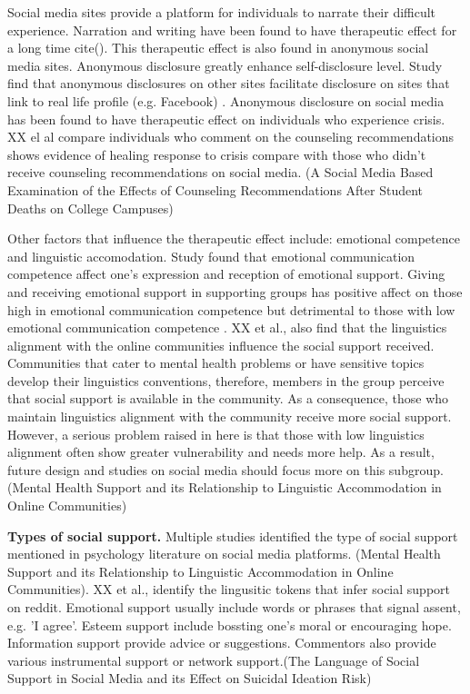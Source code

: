 Social media sites provide a platform for individuals to narrate their difficult experience. Narration and writing have been found to have therapeutic effect for a long time cite(). This therapeutic effect is also found in anonymous social media sites. Anonymous disclosure greatly enhance self-disclosure level. Study find that anonymous disclosures on other sites facilitate disclosure on sites that link to real life profile (e.g. Facebook) \cite{andalibi2018announcing}. Anonymous disclosure on social media has been found to have therapeutic effect on individuals who experience crisis. XX el al compare individuals who comment on the counseling recommendations shows evidence of healing response to crisis compare with those who didn't receive counseling recommendations on social media.  (A Social Media Based Examination of the Effects of Counseling Recommendations After Student Deaths on College Campuses) 

Other factors that influence the therapeutic effect include: emotional competence and linguistic accomodation. Study found that emotional communication competence affect one's expression and reception of emotional support. Giving and receiving emotional support in supporting groups has positive affect on those high in emotional communication competence but detrimental to those with low emotional communication competence \cite{yoo2014giving}. XX et al., also find that the linguistics alignment with the online communities influence the social support received. Communities that cater to mental health problems or have sensitive topics develop their linguistics conventions, therefore, members in the group perceive that social support is available in the community. As a consequence, those who maintain linguistics alignment with the community receive more social support. However, a serious problem raised in here is that those with low linguistics alignment often show greater vulnerability and needs more help. As a result, future design and studies on social media should focus more on this subgroup. (Mental Health Support and its Relationship to Linguistic Accommodation in Online Communities)

\textbf{Types of social support.} Multiple studies identified the type of social support mentioned in psychology literature on social media platforms. \cite{yoo2014giving}(Mental Health Support and its Relationship to Linguistic Accommodation in Online Communities). XX et al., identify the lingusitic tokens that infer social support on reddit. Emotional support usually include words or phrases that signal assent, e.g. 'I agree'. Esteem support include bossting one's moral or encouraging hope. Information support provide advice or suggestions. Commentors also provide various instrumental support or network support.(The Language of Social Support in Social Media and its Effect on Suicidal Ideation Risk)

